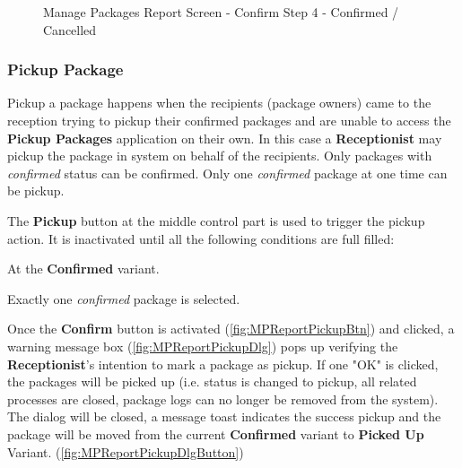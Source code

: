 \begin{figure}[H]
	\centering
	\hspace{5pt}
    \caption{Manage Packages Report Screen - Confirm Step 4 - Confirmed / Cancelled}
	\label{fig:MPReportConfirmDlgButton}
\end{figure}

\subsubsection{Pickup Package}
\label{subsubsec:MPpickup}

Pickup a package happens when the recipients (package owners) came to the reception trying to pickup their confirmed packages and are unable to access the \textbf{Pickup Packages} application on their own. In this case a \textbf{Receptionist} may pickup the package in system on behalf of the recipients. Only packages with \textit{confirmed} status can be confirmed. Only one \textit{confirmed} package at one time can be pickup.

The \textbf{Pickup} button at the middle control part is used to trigger the pickup action. It is inactivated until all the following conditions are full filled:

\begin{compactenum}
    \item At the \textbf{Confirmed} variant.
    \item Exactly one \textit{confirmed} package is selected.
\end{compactenum}

\bigskip
Once the \textbf{Confirm} button is activated (\autoref{fig:MPReportPickupBtn}) and clicked, a warning message box (\autoref{fig:MPReportPickupDlg}) pops up verifying the \textbf{Receptionist}'s intention to mark a package as pickup. If one "OK" is clicked, the packages will be picked up (i.e. status is changed to pickup, all related processes are closed, package logs can no longer be removed from the system). The dialog will be closed, a message toast indicates the success pickup and the package will be moved from the current \textbf{Confirmed} variant to \textbf{Picked Up} Variant. (\autoref{fig:MPReportPickupDlgButton})

